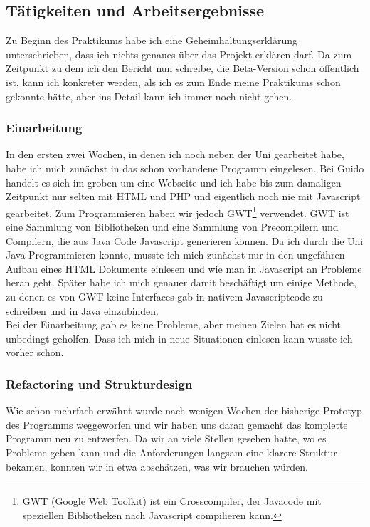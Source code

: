 \subsection{Tätigkeiten und Arbeitsergebnisse}

Zu Beginn des Praktikums habe ich eine Geheimhaltungserklärung unterschrieben, dass ich nichts genaues über das Projekt erklären darf. Da zum Zeitpunkt zu dem ich den Bericht nun schreibe, die Beta-Version schon öffentlich ist, kann ich konkreter werden, als ich es zum Ende meine Praktikums schon gekonnte hätte, aber ins Detail kann ich immer noch nicht gehen.

\subsubsection{Einarbeitung}

In den ersten zwei Wochen, in denen ich noch neben der Uni gearbeitet habe, habe ich mich zunächst in das schon vorhandene Programm eingelesen. Bei Guido handelt es sich im groben um eine Webseite und ich habe bis zum damaligen Zeitpunkt nur selten mit HTML und PHP und eigentlich noch nie mit Javascript gearbeitet. Zum Programmieren haben wir jedoch GWT\footnote{GWT (Google Web Toolkit) ist ein Crosscompiler, der Javacode mit speziellen Bibliotheken nach Javascript compilieren kann.} verwendet. GWT ist eine Sammlung von Bibliotheken und eine Sammlung von Precompilern und Compilern, die aus Java Code Javascript generieren können. Da ich durch die Uni Java Programmieren konnte, musste ich mich zunächst nur in den ungefähren Aufbau eines HTML Dokuments einlesen und wie man in Javascript an Probleme heran geht. Später habe ich mich genauer damit beschäftigt um einige Methode, zu denen es von GWT keine Interfaces gab in nativem Javascriptcode zu schreiben und in Java einzubinden.\\

Bei der Einarbeitung gab es keine Probleme, aber meinen Zielen hat es nicht unbedingt geholfen. Dass ich mich in neue Situationen einlesen kann wusste ich vorher schon.

\subsubsection{Refactoring und Strukturdesign}

Wie schon mehrfach erwähnt wurde nach wenigen Wochen der bisherige Prototyp des Programms weggeworfen und wir haben uns daran gemacht das komplette Programm neu zu entwerfen. Da wir an viele Stellen gesehen hatte, wo es Probleme geben kann und die Anforderungen langsam eine klarere Struktur bekamen, konnten wir in etwa abschätzen, was wir brauchen würden.\\

